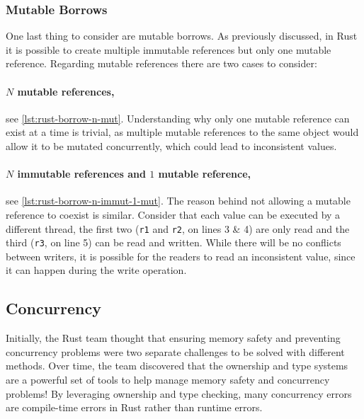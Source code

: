 \subsubsection*{Mutable Borrows}

One last thing to consider are mutable borrows.
As previously discussed, in Rust it is possible to create multiple immutable references but only one mutable reference.
Regarding mutable references there are two cases to consider:

\paragraph{$N$ mutable references,} see \autoref{lst:rust-borrow-n-mut}.
Understanding why only one mutable reference can exist at a time is trivial,
as multiple mutable references to the same object would allow it to be mutated concurrently,
which could lead to inconsistent values.

\paragraph{$N$ immutable references and $1$ mutable reference,} see \autoref{lst:rust-borrow-n-immut-1-mut}.
The reason behind not allowing a mutable reference to coexist is similar.
Consider that each value can be executed by a different thread,
the first two (\texttt{r1} and \texttt{r2}, on lines 3 \& 4) are only read and the third (\texttt{r3}, on line 5) can be read and written.
While there will be no conflicts between writers, it is possible for the readers to read an inconsistent value,
since it can happen during the write operation.





\subsection{Concurrency}\label{sec:rust-lang:concurrency}

\begin{displayquote}
    Initially, the Rust team thought that ensuring memory safety and preventing concurrency problems were two separate challenges to be solved with different methods.
    Over time, the team discovered that the ownership and type systems are a powerful set of tools to help manage memory safety and concurrency problems!
    By leveraging ownership and type checking, many concurrency errors are compile-time errors in Rust rather than runtime errors.
\end{displayquote}

